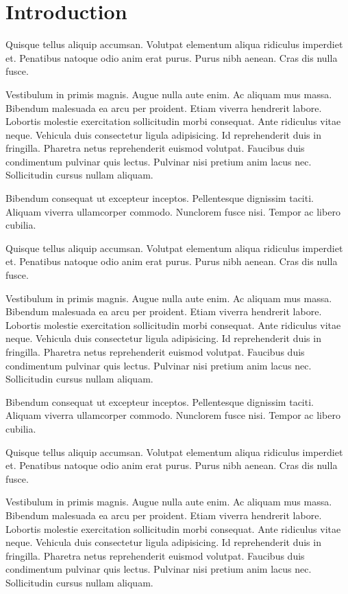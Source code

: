\chapter{Introduction}

Quisque tellus aliquip accumsan. Volutpat elementum aliqua ridiculus imperdiet et. Penatibus natoque odio anim erat purus. Purus nibh aenean. Cras dis nulla fusce.

Vestibulum in primis magnis. Augue nulla aute enim. Ac aliquam mus massa. Bibendum malesuada ea arcu per proident. Etiam viverra hendrerit labore.
Lobortis molestie exercitation sollicitudin morbi consequat. Ante ridiculus vitae neque. Vehicula duis consectetur ligula adipisicing. Id reprehenderit duis in fringilla. Pharetra netus reprehenderit euismod volutpat.
Faucibus duis condimentum pulvinar quis lectus. Pulvinar nisi pretium anim lacus nec. Sollicitudin cursus nullam aliquam.

Bibendum consequat ut excepteur inceptos. Pellentesque dignissim taciti. Aliquam viverra ullamcorper commodo. Nunclorem fusce nisi. Tempor ac libero cubilia.

Quisque tellus aliquip accumsan. Volutpat elementum aliqua ridiculus imperdiet et. Penatibus natoque odio anim erat purus. Purus nibh aenean. Cras dis nulla fusce.

Vestibulum in primis magnis. Augue nulla aute enim. Ac aliquam mus massa. Bibendum malesuada ea arcu per proident. Etiam viverra hendrerit labore.
Lobortis molestie exercitation sollicitudin morbi consequat. Ante ridiculus vitae neque. Vehicula duis consectetur ligula adipisicing. Id reprehenderit duis in fringilla. Pharetra netus reprehenderit euismod volutpat.
Faucibus duis condimentum pulvinar quis lectus. Pulvinar nisi pretium anim lacus nec. Sollicitudin cursus nullam aliquam.

Bibendum consequat ut excepteur inceptos. Pellentesque dignissim taciti. Aliquam viverra ullamcorper commodo. Nunclorem fusce nisi. Tempor ac libero cubilia.

Quisque tellus aliquip accumsan. Volutpat elementum aliqua ridiculus imperdiet et. Penatibus natoque odio anim erat purus. Purus nibh aenean. Cras dis nulla fusce.

Vestibulum in primis magnis. Augue nulla aute enim. Ac aliquam mus massa. Bibendum malesuada ea arcu per proident. Etiam viverra hendrerit labore.
Lobortis molestie exercitation sollicitudin morbi consequat. Ante ridiculus vitae neque. Vehicula duis consectetur ligula adipisicing. Id reprehenderit duis in fringilla. Pharetra netus reprehenderit euismod volutpat.
Faucibus duis condimentum pulvinar quis lectus. Pulvinar nisi pretium anim lacus nec. Sollicitudin cursus nullam aliquam.

